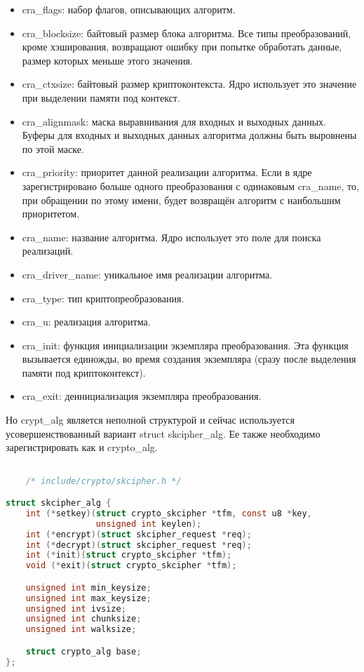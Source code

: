 \begin{itemize}
    \item cra\_flags: набор флагов, описывающих алгоритм.
    \item cra\_blocksize: байтовый размер блока алгоритма. Все типы преобразований, кроме хэширования, возвращают ошибку при попытке обработать данные, размер которых меньше этого значения.
    \item cra\_ctxsize: байтовый размер криптоконтекста. Ядро использует это значение при выделении памяти под контекст.
    \item cra\_alignmask: маска выравнивания для входных и выходных данных. Буферы для входных и выходных данных алгоритма должны быть выровнены по этой маске.
    \item cra\_priority: приоритет данной реализации алгоритма. Если в ядре зарегистрировано больше одного преобразования с одинаковым cra\_name, то, при обращении по этому имени, будет возвращён алгоритм с наибольшим приоритетом.
    \item cra\_name: название алгоритма. Ядро использует это поле для поиска реализаций.
    \item cra\_driver\_name: уникальное имя реализации алгоритма. 
    \item cra\_type: тип криптопреобразования.
    \item cra\_u: реализация алгоритма.
    \item cra\_init: функция инициализации экземпляра преобразования. Эта функция вызывается единожды, во время создания экземпляра (сразу после выделения памяти под криптоконтекст).
    \item cra\_exit: деинициализация экземпляра преобразования.
\end{itemize}

Но crypt\_alg является неполной структурой и сейчас используется усовершенствованный вариант struct skcipher\_alg.
Ее также необходимо зарегистрировать как и crypto\_alg.

\begin{lstlisting}[language=c, label=some-code, caption=Структура skcipher\_alg]

    /* include/crypto/skcipher.h */

struct skcipher_alg {
    int (*setkey)(struct crypto_skcipher *tfm, const u8 *key,
                  unsigned int keylen);
    int (*encrypt)(struct skcipher_request *req);
    int (*decrypt)(struct skcipher_request *req);
    int (*init)(struct crypto_skcipher *tfm);
    void (*exit)(struct crypto_skcipher *tfm);

    unsigned int min_keysize;
    unsigned int max_keysize;
    unsigned int ivsize;
    unsigned int chunksize;
    unsigned int walksize;

    struct crypto_alg base;
};

\end{lstlisting}

